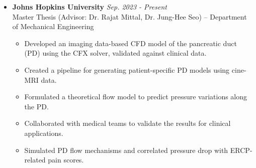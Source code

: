 \documentclass[10pt]{article} %
\begin{document}
\begin{itemize}[leftmargin=*,itemsep=1pt]

    \item \textbf{Johns Hopkins University} \hfill \textit{Sep. 2023 - Present} \\
    Master Thesis (Advisor: Dr. Rajat Mittal, Dr. Jung-Hee Seo) – Department of Mechanical Engineering
    \begin{itemize}[leftmargin=*,itemsep=1pt]
        \item Developed an imaging data-based CFD model of the pancreatic duct (PD) using the CFX solver, validated against clinical data.
        \item Created a pipeline for generating patient-specific PD models using cine-MRI data.
        \item Formulated a theoretical flow model to predict pressure variations along the PD.
        \item Collaborated with medical teams to validate the results for clinical applications.
        \item Simulated PD flow mechanisms and correlated pressure drop with ERCP-related pain scores.
    \end{itemize}



\end{itemize}
\end{document}
